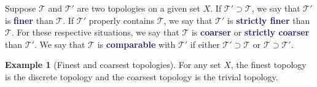 \documentclass[11pt]{article}
\numberwithin{equation}{section}
\newcommand{\navy}[1]{\textcolor{MidnightBlue}{\bf #1}}
\newcounter{theo}[section]\setcounter{theo}{0}
\theoremstyle{definition}
\theoremstyle{definition}
\newtheorem{example}{\color{WildStrawberry}Example}[section]
\newcommand{\1}{\mathbbm 1}
\newcommand{\tT}{\mathcal T}
\begin{document}

\begin{definition}
	Suppose $\tT$ and $\tT'$ are two topologies on a given set $X$. If $\tT' \supset \tT$, we say that $\tT'$ is \navy{finer} than $\tT$. If $\tT'$ properly contains $\tT$, we say that $\tT'$ is \navy{strictly finer} than $\tT$. For these respective situations, we say that $\tT$ is \navy{coarser} or \navy{strictly coarser} than $\tT'$. We say that $\tT$ is \navy{comparable} with $\tT'$ if either $\tT' \supset \tT$ or $\tT \supset \tT'$.
\end{definition}

\begin{example}[Finest and coarsest topologies]
	For any set $X$, the finest topology is the discrete topology and the coarsest topology is the trivial topology. 
\end{example}
\end{document}
